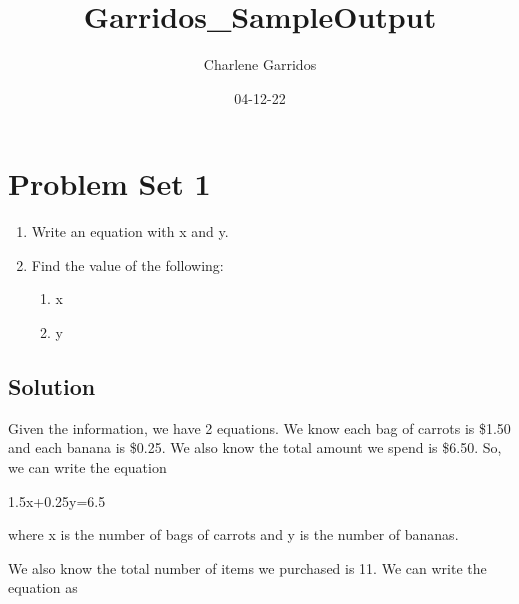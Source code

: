\documentclass[
]{article}
\title{Garridos\_SampleOutput}
\author{Charlene Garridos}
\date{04-12-22}
\newenvironment{Shaded}{\begin{snugshade}}{\end{snugshade}}
\newcommand{\DecValTok}[1]{\textcolor[rgb]{0.00,0.00,0.81}{#1}}
\newcommand{\FloatTok}[1]{\textcolor[rgb]{0.00,0.00,0.81}{#1}}
\newcommand{\NormalTok}[1]{#1}
\newcommand{\SpecialCharTok}[1]{\textcolor[rgb]{0.00,0.00,0.00}{#1}}
\providecommand{\tightlist}{%
  \setlength{\itemsep}{0pt}\setlength{\parskip}{0pt}}
\begin{document}
\maketitle

\hypertarget{problem-set-1}{%
\section{Problem Set 1}\label{problem-set-1}}

\begin{Shaded}
\end{Shaded}

\begin{enumerate}
\def\labelenumi{\arabic{enumi}.}
\tightlist
\item
  Write an equation with x and y.
\item
  Find the value of the following:

  \begin{enumerate}
  \def\labelenumii{\alph{enumii}.}
  \tightlist
  \item
    x
  \item
    y
  \end{enumerate}
\end{enumerate}

\hypertarget{solution}{%
\subsection{Solution}\label{solution}}

Given the information, we have 2 equations. We know each bag of carrots
is \$1.50 and each banana is \$0.25. We also know the total amount we
spend is \$6.50. So, we can write the equation

1.5x+0.25y=6.5

where x is the number of bags of carrots and y is the number of bananas.

We also know the total number of items we purchased is 11. We can write
the equation as
\end{document}
